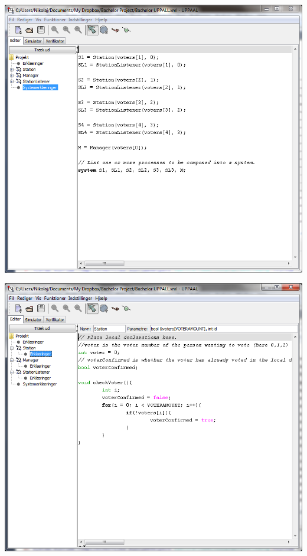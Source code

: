 \documentclass[a4paper]{report}
\begin{document}
\begin{center}
\includegraphics[width=\textwidth]{UPPAAL7.png}
\end{center}
\begin{center}
\includegraphics[width=\textwidth]{UPPAAL8.png}
\end{center}
\end{document}
